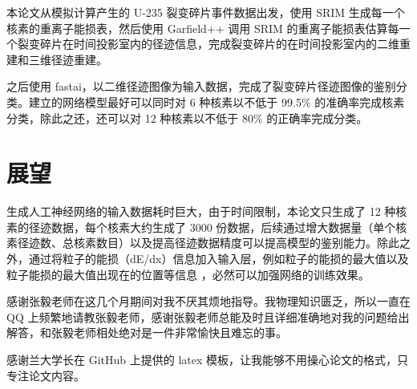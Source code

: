 \documentclass[AutoFakeBold]{LZUThesis}
\begin{document}
本论文从模拟计算产生的 U-235 裂变碎片事件数据出发，使用 SRIM 生成每一个核素的重离子能损表，然后使用 Garfield++ 调用 SRIM 的重离子能损表估算每一个裂变碎片在时间投影室内的径迹信息，完成裂变碎片的在时间投影室内的二维重建和三维径迹重建。

之后使用 fastai，以二维径迹图像为输入数据，完成了裂变碎片径迹图像的鉴别分类。建立的网络模型最好可以同时对 6 种核素以不低于 99.5\% 的准确率完成核素分类，除此之还，还可以对 12 种核素以不低于 80\% 的正确率完成分类。



\section{展望}
生成人工神经网络的输入数据耗时巨大，由于时间限制，本论文只生成了 12 种核素的径迹数据，每个核素大约生成了 3000 份数据，后续通过增大数据量（单个核素径迹数、总核素数目）以及提高径迹数据精度可以提高模型的鉴别能力。除此之外，通过将粒子的能损（dE/dx）信息加入输入层，例如粒子的能损的最大值以及粒子能损的最大值出现在的位置等信息 \cite{闫洋洋2018用于高精度裂变截面测量的时间投影室}，必然可以加强网络的训练效果。


\backmatter


\printbib



\Thanks
感谢张毅老师在这几个月期间对我不厌其烦地指导。我物理知识匮乏，所以一直在 QQ 上频繁地请教张毅老师，感谢张毅老师总能及时且详细准确地对我的问题给出解答，和张毅老师相处绝对是一件非常愉快且难忘的事。

感谢兰大学长在 GitHub 上提供的 latex 模板，让我能够不用操心论文的格式，只专注论文内容。
\end{document}
